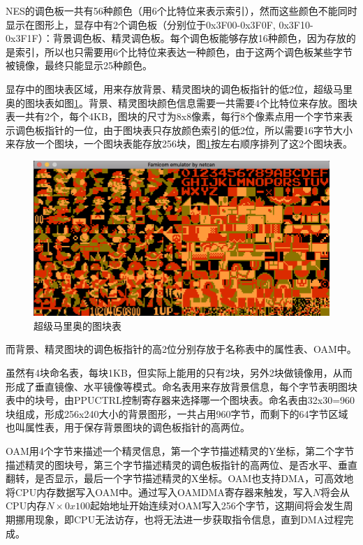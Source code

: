\documentclass[a4paper]{ltxdoc}
\begin{document}
{NES的调色板一共有56种颜色（用6个比特位来表示索引），然而这些颜色不能同时显示在图形上，显存中有2个调色板（分别位于0x3F00-0x3F0F, 0x3F10-0x3F1F）：背景调色板、精灵调色板。每个调色板能够存放16种颜色，因为存放的是索引，所以也只需要用6个比特位来表达一种颜色，由于这两个调色板某些字节被镜像，最终只能显示25种颜色。

显存中的图块表区域，用来存放背景、精灵图块的调色板指针的低2位，超级马里奥的图块表如图\ref{fig:pattern_table}。背景、精灵图块颜色信息需要一共需要4个比特位来存放。图块表一共有2个，每个4KB，图块的尺寸为8x8像素，每行8个像素点用一个字节来表示调色板指针的一位，由于图块表只存放颜色索引的低2位，所以需要16字节大小来存放一个图块，一个图块表能存放256块，图\ref{fig:pattern_table}按左右顺序排列了这2个图块表。

\begin{figure}[h]
	\centering
	\includegraphics[width=\textwidth]{images/pattern_table.png}
	\caption{超级马里奥的图块表}
	\label{fig:pattern_table}
\end{figure}

而背景、精灵图块的调色板指针的高2位分别存放于名称表中的属性表、OAM中。

虽然有4块命名表，每块1KB，但实际上能用的只有2块，另外2块做镜像用，从而形成了垂直镜像、水平镜像等模式。命名表用来存放背景信息，每个字节表明图块表中的块号，由PPUCTRL控制寄存器来选择哪一个图块表。命名表由32x30=960块组成，形成256x240大小的背景图形，一共占用960字节，而剩下的64字节区域也叫属性表，用于保存背景图块的调色板指针的高两位。

OAM用4个字节来描述一个精灵信息，第一个字节描述精灵的Y坐标，第二个字节描述精灵的图块号，第三个字节描述精灵的调色板指针的高两位、是否水平、垂直翻转，是否显示，最后一个字节描述精灵的X坐标。OAM也支持DMA，可高效地将CPU内存数据写入OAM中。通过写入OAMDMA寄存器来触发，写入$N$将会从CPU内存$N\times 0x100$起始地址开始连续对OAM写入256个字节，这期间将会发生周期挪用现象，即CPU无法访存，也将无法进一步获取指令信息，直到DMA过程完成。

}
\end{document}
